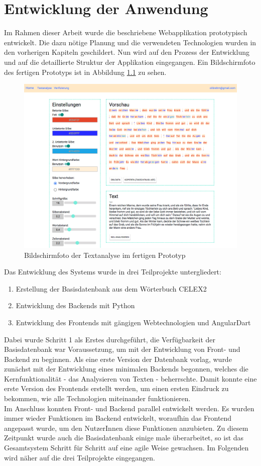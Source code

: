 
\chapter{Entwicklung der Anwendung}

Im Rahmen dieser Arbeit wurde die beschriebene Webapplikation prototypisch entwickelt. Die dazu nötige Planung und die verwendeten Technologien wurden in den vorherigen Kapiteln geschildert. Nun wird auf den Prozess der Entwicklung und auf die detaillierte Struktur der Applikation eingegangen. Ein Bildschirmfoto des fertigen Prototyps ist in Abbildung \ref{fig:textanalyse} zu sehen.

\begin{figure}[h!]
	\centering
	\includegraphics[width=.8\linewidth, frame]{figures/frontend/textanalyse}
	\caption{Bildschirmfoto der Textanalyse im fertigen Prototyp}
	\label{fig:textanalyse}
\end{figure}

Das Entwicklung des Systems wurde in drei Teilprojekte untergliedert:
\begin{enumerate}
	\item Erstellung der Basisdatenbank aus dem Wörterbuch CELEX2
	\item Entwicklung des Backends mit Python
	\item Entwicklung des Frontends mit gängigen Webtechnologien und AngularDart
\end{enumerate}

Dabei wurde Schritt 1 als Erstes durchgeführt, die Verfügbarkeit der Basisdatenbank war Voraussetzung, um mit der Entwicklung von Front- und Backend zu beginnen. Als eine erste Version der Datenbank vorlag, wurde zunächst mit der Entwicklung eines minimalen Backends begonnen, welches die Kernfunktionalität - das Analysieren von Texten - beherrschte. Damit konnte eine erste Version des Frontends erstellt werden, um einen ersten Eindruck zu bekommen, wie alle Technologien miteinander funktionieren.\\
Im Anschluss konnten Front- und Backend parallel entwickelt werden. Es wurden immer wieder Funktionen im Backend entwickelt, woraufhin das Frontend angepasst wurde, um den NutzerInnen diese Funktionen anzubieten. Zu diesem Zeitpunkt wurde auch die Basisdatenbank einige male überarbeitet, so ist das Gesamtsystem Schritt für Schritt auf eine agile Weise  gewachsen. Im Folgenden wird näher auf die drei Teilprojekte eingegangen.

